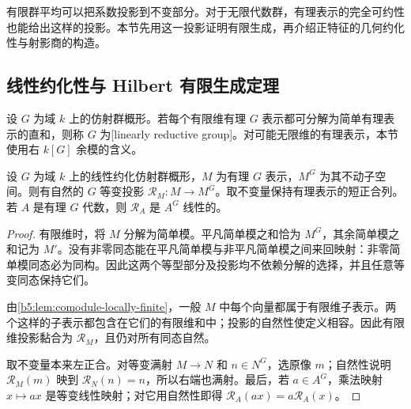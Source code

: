 %
%

有限群平均可以把系数投影到不变部分。对于无限代数群，有理表示的完全可约性也能给出这样的投影。本节先用这一投影证明有限生成，再介绍正特征的几何约化性与射影商的构造。

\subsection{线性约化性与 Hilbert 有限生成定理}
\label{b5:subsec:2207:01}

\begin{definition}\label{b5:def:linearly-reductive}
	设 \(G\) 为域 \(k\) 上的仿射群概形。若每个有限维有理 \(G\) 表示都可分解为简单有理表示的直和，则称 \(G\) 为[linearly reductive group]。对可能无限维的有理表示，本节使用右 \(k[G]\) 余模的含义。
\end{definition}

\begin{lemma}\label{b5:lem:reductive-reynolds}
	设 \(G\) 为域 \(k\) 上的线性约化仿射群概形，\(M\) 为有理 \(G\) 表示，\(M^G\) 为其不动子空间。则有自然的 \(G\) 等变投影 \(\mathcal R_M:M\to M^G\)。取不变量保持有理表示的短正合列。若 \(A\) 是有理 \(G\) 代数，则 \(\mathcal R_A\) 是 \(A^G\) 线性的。
\end{lemma}
\begin{proof}
	有限维时，将 \(M\) 分解为简单模。平凡简单模之和恰为 \(M^G\)，其余简单模之和记为 \(M'\)。没有非零同态能在平凡简单模与非平凡简单模之间来回映射：非零简单模同态必为同构。因此这两个等型部分及投影均不依赖分解的选择，并且任意等变同态保持它们。

	由\cref{b5:lem:comodule-locally-finite}，一般 \(M\) 中每个向量都属于有限维子表示。两个这样的子表示都包含在它们的有限维和中；投影的自然性使定义相容。因此有限维投影黏合为 \(\mathcal R_M\)，且仍对所有同态自然。

	取不变量本来左正合。对等变满射 \(M\to N\) 和 \(n\in N^G\)，选原像 \(m\)；自然性说明 \(\mathcal R_M(m)\) 映到 \(\mathcal R_N(n)=n\)，所以右端也满射。最后，若 \(a\in A^G\)，乘法映射 \(x\mapsto ax\) 是等变线性映射；对它用自然性即得 \(\mathcal R_A(ax)=a\mathcal R_A(x)\)。
\end{proof}

